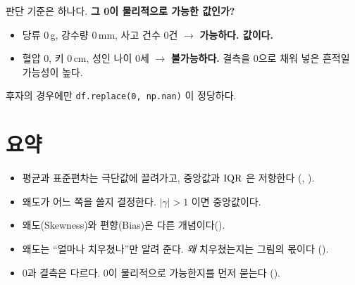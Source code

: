 \begin{keyidea}
판단 기준은 하나다. \textbf{그 0이 물리적으로 가능한 값인가?}

\begin{itemize}
  \item 당류 0\,g, 강수량 0\,mm, 사고 건수 0건 $\rightarrow$ \textbf{가능하다. 값이다.}
  \item 혈압 0, 키 0\,cm, 성인 나이 0세 $\rightarrow$ \textbf{불가능하다.} 결측을
        0으로 채워 넣은 흔적일 가능성이 높다.
\end{itemize}

후자의 경우에만 \verb|df.replace(0, np.nan)| 이 정당하다.
\end{keyidea}

\section{요약}

\begin{itemize}
  \item 평균과 표준편차는 극단값에 끌려가고, 중앙값과 $\mathrm{IQR}$ 은 저항한다
        (, ).
  \item 왜도가 어느 쪽을 쓸지 결정한다. $|\gamma| > 1$ 이면 중앙값이다.
  \item 왜도(Skewness)와 편향(Bias)은 다른 개념이다().
  \item 왜도는 ``얼마나 치우쳤나''만 알려 준다. \emph{왜} 치우쳤는지는 그림의 몫이다
        ().
  \item 0과 결측은 다르다. 0이 물리적으로 가능한지를 먼저 묻는다
        ().
\end{itemize}
